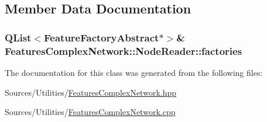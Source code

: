 \subsection{Member Data Documentation}
\hypertarget{class_features_complex_network_1_1_node_reader_a488f9f45d6015c0dc00d6a1ff5b04e2a}{
\subsubsection[{factories}]{\setlength{\rightskip}{0pt plus 5cm}Q\+List$<${\bf Feature\+Factory\+Abstract}$\ast$$>$\& Features\+Complex\+Network\+::\+Node\+Reader\+::factories\hspace{0.3cm}{\ttfamily [private]}}}\label{class_features_complex_network_1_1_node_reader_a488f9f45d6015c0dc00d6a1ff5b04e2a}


The documentation for this class was generated from the following files\+:\begin{DoxyCompactItemize}
\item 
Sources/\+Utilities/\hyperlink{_features_complex_network_8hpp}{Features\+Complex\+Network.\+hpp}\item 
Sources/\+Utilities/\hyperlink{_features_complex_network_8cpp}{Features\+Complex\+Network.\+cpp}\end{DoxyCompactItemize}
